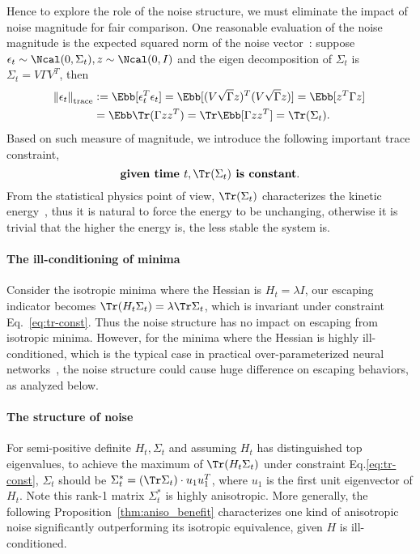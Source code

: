 \documentclass{article}
\begin{document}
Hence to explore the role of the noise structure, we must eliminate the impact of noise magnitude for fair comparison.
One reasonable evaluation of the noise magnitude is the expected squared norm of the noise vector~\citep{li2017stochastic}:
suppose $\epsilon_t \sim \Ncal(0, \Sigma_t), z\sim\Ncal(0,I)$ and the eigen decomposition of $\Sigma_t$ is $\Sigma_t = V \Gamma V^T$, then
\begin{equation*}
    \begin{aligned}
        \norm{\epsilon_t}_{\text{trace}} &:= \Ebb [\epsilon_t^T \epsilon_t] = \Ebb [(V\sqrt{\Gamma}z)^T (V\sqrt{\Gamma}z)] = \Ebb [z^T \Gamma z] \\
        &= \Ebb \Tr (\Gamma z z^T) = \Tr \Ebb [\Gamma z z^T] = \Tr (\Sigma_t).
    \end{aligned}
\end{equation*}
Based on such measure of magnitude, we introduce the following important trace constraint,
\begin{equation}
    \textbf{given time } t,  \Tr (\Sigma_t)  \textbf{ is constant}.
    \label{eq:tr-const}
\end{equation}
From the statistical physics point of view, $\Tr (\Sigma_t)$ characterizes the kinetic energy~\cite{gardiner2009stochastic}, thus it is natural to force the energy to be unchanging, otherwise it is trivial that the higher the energy is, the less stable the system is.

\paragraph{The ill-conditioning of minima}
Consider the isotropic minima where the Hessian is $H_t=\lambda I$, our escaping indicator becomes $\Tr(H_t\Sigma_t) = \lambda \Tr\Sigma_t$, which is invariant under constraint Eq.~\eqref{eq:tr-const}.
Thus the noise structure has no impact on escaping from isotropic minima.
However, for the minima where the Hessian is highly ill-conditioned, which is the typical case in practical over-parameterized neural networks~\cite{sagun2017empirical}, the noise structure could cause huge difference on escaping behaviors, as analyzed below. 

\paragraph{The structure of noise}
For semi-positive definite $H_t, \Sigma_t$ and assuming $H_t$ has distinguished top eigenvalues, to achieve the maximum of $\Tr(H_t\Sigma_t)$ under constraint Eq.\eqref{eq:tr-const}, $\Sigma_t$ should be $\Sigma_t^* = (\Tr\Sigma_t)\cdot u_1 u_1^T$, where $u_1$ is the first unit eigenvector of $H_t$.
Note this rank-1 matrix $\Sigma_t^*$ is highly anisotropic.
More generally, the following Proposition~\ref{thm:aniso_benefit} characterizes one kind of anisotropic noise significantly outperforming its isotropic equivalence, given $H$ is ill-conditioned.
\end{document}
